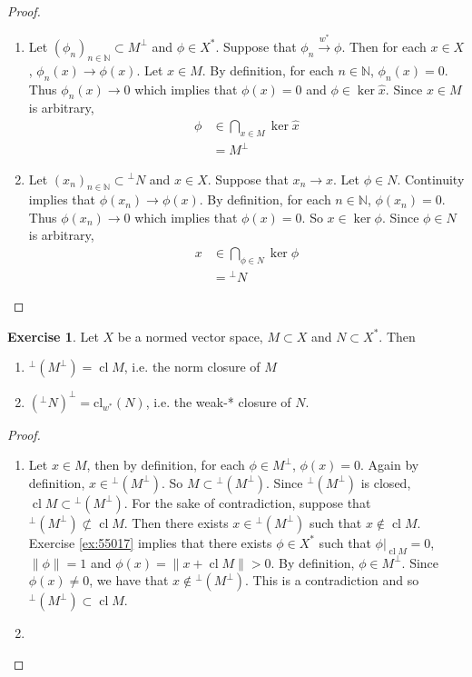 \documentclass[12pt]{amsart}
\theoremstyle{definition}
\newtheorem{ex}[definition]{Exercise}
\newcommand{\N}{\mathbb{N}}
\newcommand{\conv}[1]{\xrightarrow{#1}}
\DeclareMathOperator{\cl}{cl}
\DeclareMathOperator*{\0}{\mbf{0}}
\DeclareMathOperator*{\1}{\mbf{1}}
\newcommand{\rex}[1]{Exercise \ref{ex:#1}}
\begin{document}
	\begin{proof}\
	\begin{enumerate}
	\item Let $(\phi_n)_{n \in \N} \subset M^{\perp}$ and $\phi \in X^*$. Suppose that $\phi_n \conv{w^*} \phi$. Then for each $x \in X$, $\phi_n(x) \rightarrow \phi(x)$. Let $x \in M$. By definition, for each $n \in \N$, $\phi_n(x) = 0$. Thus $\phi_n(x) \rightarrow 0$ which implies that $\phi(x) = 0$ and $\phi \in \ker \hat{x}$. Since $x \in M$ is arbitrary, 
	\begin{align*}
	\phi 
	&\in \bigcap_{x \in M} \ker \hat{x} \\
	&= M^{\perp}
	\end{align*}
	\item Let $(x_n)_{n \in \N} \subset {^{\perp} N}$ and $x \in X$. Suppose that $x_n \rightarrow x$. Let $\phi \in N$. Continuity implies that $\phi(x_n) \rightarrow \phi(x)$. By definition, for each $n \in \N$, $\phi(x_n) = 0$. Thus $\phi(x_n) \rightarrow 0$ which implies that $\phi(x) = 0$. So $x \in \ker \phi$. Since $\phi \in N$ is arbitrary, 
	\begin{align*}
	x 
	&\in \bigcap_{\phi \in N} \ker \phi \\
	&= {^{\perp}N}
	\end{align*}
	\end{enumerate}
	\end{proof}
	
	\begin{ex}
	Let $X$ be a normed vector space, $M \subset X$ and $N \subset X^*$. Then 
	\begin{enumerate}
	\item $^{\perp}(M^{\perp}) = \cl M$, i.e. the norm closure of $M$
	\item $({^{\perp}N})^{\perp} = \text{cl}_{w^*}(N)$, i.e. the weak-* closure of $N$.
	\end{enumerate}
	\end{ex}
	
	\begin{proof}\
	\begin{enumerate}
	\item Let $x \in M$, then by definition, for each $\phi \in M^{\perp}$, $\phi(x) = 0$. Again by definition, $x \in {^{\perp}(M^{\perp})}$. So $M \subset {^{\perp}(M^{\perp})}$. Since ${^{\perp}(M^{\perp})}$ is closed, $\cl M \subset {^{\perp}(M^{\perp})}$. For the sake of contradiction, suppose that ${^{\perp}(M^{\perp})} \not \subset \cl M$. Then there exists $x \in {^{\perp}(M^{\perp})}$ such that $x \not \in \cl M$. \rex{55017} implies that there exists $\phi \in X^*$ such that $\phi|_{\cl M} = 0$, $\|\phi\| = 1$ and $\phi(x) = \|x + \cl M\| > 0$. By definition, $\phi \in M^{\perp}$. Since $\phi(x) \neq 0$, we have that $x \not \in {^{\perp}(M^{\perp})}$. This is a contradiction and so ${^{\perp}(M^{\perp})} \subset \cl M$.
	\item 
	\end{enumerate}
	\end{proof}
	
\end{document}
